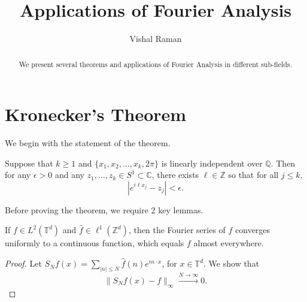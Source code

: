 \documentclass[11pt]{scrartcl}
\newcommand{\Z}{\mathbb{Z}}
\newcommand{\Q}{\mathbb{Q}}
\newcommand{\C}{\mathbb C}
\newcommand{\T}{\mathbb T}
\let \hat \widehat
\newcommand{\<}{\langle}
\renewcommand{\>}{\rangle}
\begin{document}
\title{Applications of Fourier Analysis}
\author{Vishal Raman}
\maketitle
\begin{abstract}
   We present several theorems and applications of Fourier Analysis in different sub-fields.  
\end{abstract}
\section{Kronecker's Theorem}
We begin with the statement of the theorem.
\begin{theorem}[Kronecker] Suppose that $k \ge 1$ and $\{x_1, x_2, \dots, x_k, 2\pi\}$ is linearly independent over $\Q$.  Then for any $\epsilon > 0$ and any $z_1, \dots, z_k \in S^1 \subset \C$, there exists $\ell \in \Z$ so that for all $j \le k,$
$$|e^{i\ell x_j} - z_j| < \epsilon.$$
\end{theorem}
Before proving the theorem, we require 2 key lemmas.  
\begin{lemma} If $f \in L^2(\T^d)$ and $\hat{f} \in \ell^1(\Z^d)$, then the Fourier series of $f$ converges uniformly to a continuous function, which equals $f$ almost everywhere.
\end{lemma}
\begin{proof}
Let $S_Nf(x) = \sum_{|n| \le N} \hat{f}(n)e^{in\cdot x}$, for $x \in \T^d$.  We show that 
$$\|S_Nf(x) - f\|_\infty \xrightarrow{N \rightarrow \infty} 0.$$


\end{proof}
\end{document}
